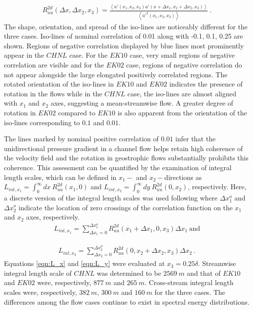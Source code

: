 \begin{align}
 R_{uu}^{2d}(\Delta x, \Delta x_2, x_3)=\frac{\left < u'(x_1, x_2, x_3)u'(x+ \Delta x_1, x_2 + \Delta x_2, x_3) \right >}{\left < u'^{2}(x_1,x_2,x_3)\right >} \ .
 \label{eqn:2d_corr}
\end{align}
The shape, orientation, and spread of the iso-lines are noticeably different for the three cases. Iso-lines of nominal correlation of 0.01 along with -0.1, 0.1, 0.25 are shown. Regions of negative correlation displayed by blue lines most prominently appear in  the $CHNL$ case. For the $EK10$ case, very small regions of negative correlation are visible and for the $EK02$ case, regions of negative correlation do not appear alongside the large elongated positively correlated regions. The rotated orientation of the iso-lines in $EK10$ and $EK02$ indicates  the presence of rotation in the flows while in the $CHNL$ case, the iso-lines are almost aligned with $x_1$ and $x_2$ axes, suggesting  a mean-streamwise flow. A greater degree of rotation in $EK02$ compared to $EK10$ is also apparent from the orientation of the iso-lines corresponding to $0.1$ and $0.01$.  

The lines marked by nominal positive correlation of $0.01$ infer that the unidirectional pressure gradient in a channel flow helps retain high coherence of the velocity field and the rotation in geostrophic flows substantially prohibits this coherence. This assessment can be quantified by the examination of integral length scales, which can be defined in $x_1-$ and $x_2-$directions as $L_{int,x_1}=\int_0^{\infty} dx\ R_{uu}^{2d}(x_1,0)$ and $L_{int,x_2}=\int_0^{\infty} dy\ R_{uu}^{2d}(0,x_2)$, respectively. Here, a discrete version of the integral length scales was used following \citet{traumner_blm_2015} where $\Delta x_1^{o}$ and $\Delta x_2^{o}$ indicate the location of zero crossings of the correlation function on the $x_1$ and $x_2$ axes, respectively. 
\begin{align}
L_{int,x_1}=\sum_{\Delta x_1=0}^{\Delta x_1^{o}}R_{uu}^{2d}(x_1+\Delta x_1, 0,x_3)\Delta x_1 \ \text{and}
\label{eqn:L_x}
\end{align}

\begin{align}
L_{int,x_2}=\sum_{\Delta x_2 = 0}^{\Delta x_2^{0}}R_{uu}^{2d}(0, x_2+\Delta x_2,x_3)\Delta x_2\ .
\label{eqn:L_y}
\end{align}
Equations \ref{eqn:L_x} and \ref{eqn:L_y} were evaluated at $x_3=0.25\delta$. Streamwise integral length scale of $CHNL$ was determined  to be $2569\ m$ and that of $EK10$ and $EK02$ were, respectively, $877\ m$ and $265\ m$. Cross-stream integral length scales were, respectively, $382\ m$, $300\ m$ and $160\ m$ for the three cases. The differences among the flow cases continue to exist in spectral energy distributions.  

